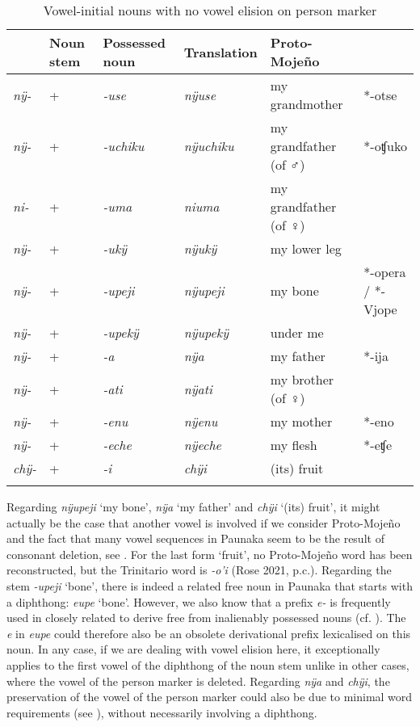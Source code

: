 \begin{table}
\caption{Vowel-initial nouns with no vowel elision on person marker}

\begin{tabularx}{\textwidth}{llllQQ}
\lsptoprule
{} & Noun stem & Possessed noun & Translation & Proto-Mojeño\\
\midrule
	\textit{nÿ-}  & + & \textit{-use} &  \textit{nÿuse} & my grandmother & *-otse\\
	\textit{nÿ-}  & + & \textit{-uchiku} &  \textit{nÿuchiku} & my grandfather (of ♂︎) & *-oʧuko\\
	\textit{ni-} & + & \textit{-uma} & \textit{niuma} & my grandfather (of ♀) & \\
	\textit{nÿ-}  & + & \textit{-ukÿ} &  \textit{nÿukÿ} & my lower leg & \\
	\textit{nÿ-}  & + & \textit{-upeji} & \textit{nÿupeji} & my bone & *-opera / *-Vjope\\
	\textit{nÿ-}  & + & \textit{-upekÿ} &  \textit{nÿupekÿ} & under me & \\
	\textit{nÿ-} & + & \textit{-a} &  \textit{nÿa} & my father & *-ija\\
	\textit{nÿ-} & + & \textit{-ati} &  \textit{nÿati} & my brother (of ♀) & \\
	\textit{nÿ-} & + & \textit{-enu} & \textit{nÿenu} & my mother & *-eno\\
	\textit{nÿ-} & + & \textit{-eche} & \textit{nÿeche} & my flesh & *-eʧe\\
	\textit{chÿ-} & + & \textit{-i} & \textit{chÿi} & (its) fruit & \\
\lspbottomrule
\end{tabularx}

\label{tab:no-elision}
\end{table}


Regarding \textit{nÿupeji} ‘my bone’, \textit{nÿa} ‘my father’ and \textit{chÿi} ‘(its) fruit’, it might actually be the case that another vowel is involved if we consider Proto-Mojeño and the fact that many vowel sequences in Paunaka seem to be the result of consonant deletion, see . For the last form ‘fruit’, no Proto-Mojeño word has been reconstructed, but the Trinitario word is \textit{-o’i} (Rose 2021, p.c.). Regarding the stem \textit{-upeji} ‘bone’, there is indeed a related free noun in Paunaka that starts with a diphthong: \textit{eupe} ‘bone’. However, we also know that a prefix \textit{e-} is frequently used in closely related  to derive free from inalienably possessed nouns (cf. \citealt[119]{Danielsen2007}). The \textit{e} in \textit{eupe} could therefore also be an obsolete derivational prefix lexicalised on this noun. In any case, if we are dealing with vowel elision here, it exceptionally applies to the first vowel of the diphthong of the noun stem unlike in other cases, where the vowel of the person marker is deleted. Regarding \textit{nÿa} and \textit{chÿi}, the preservation of the vowel of the person marker could also be due to minimal word requirements (see ), without necessarily involving a diphthong. 

